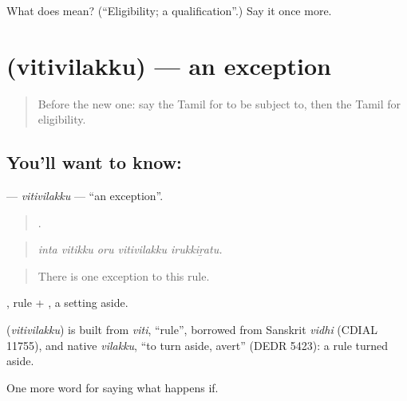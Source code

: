 \begin{tcolorbox}[breakable,colback=teal!4,colframe=teal!35!black,title={Before you move on}]
What does  mean? (\textquotedblleft{}Eligibility; a qualification\textquotedblright{}.) Say it once more.
\end{tcolorbox}
\section[\texorpdfstring{\ta{விதிவிலக்கு} (vitivilakku)}{விதிவிலக்கு (vitivilakku)}]{ (vitivilakku) — an exception}

\label{lesson:TA-C382-vitivilakku}



\begin{quote}
Before the new one: say the Tamil for to be subject to, then the Tamil for eligibility.
\end{quote}

\subsection*{You'll want to know: }
\textbf{} — \emph{vitivilakku} — \textquotedblleft{}an exception\textquotedblright{}.

\begin{quote}
    .
\end{quote}

\begin{quote}
\emph{inta vitikku oru vitivilakku irukkiṟatu.}
\end{quote}

\begin{quote}
There is one exception to this rule.
\end{quote}

, rule + , a setting aside.

\begin{cousinweb}
\textbf{} (\emph{vitivilakku}) is built from \emph{viti}, \textquotedblleft{}rule\textquotedblright{}, borrowed from Sanskrit \emph{vidhi} (CDIAL 11755), and native \emph{vilakku}, \textquotedblleft{}to turn aside, avert\textquotedblright{} (DEDR 5423): a rule turned aside.
\end{cousinweb}

\begin{grammarlens}[title={What you've built}]
One more word for saying what happens if.
\end{grammarlens}

